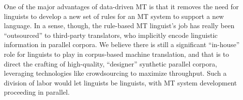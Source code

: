 One of the major advantages of data-driven MT is that it removes the need for linguists to develop a new set of rules for an MT system to support a new language.
In a sense, though, the rule-based MT linguist's job has really been  ``outsourced'' to third-party translators, who implicitly encode linguistic information in parallel corpora.
We believe there is still a significant ``in-house'' role for linguists to play in corpus-based machine translation, and that is to direct the crafting of high-quality, ``designer'' synthetic parallel corpora, leveraging technologies like crowdsourcing to maximize throughput.
Such a division of labor would let linguists be linguists, with MT system development proceeding in parallel.  


